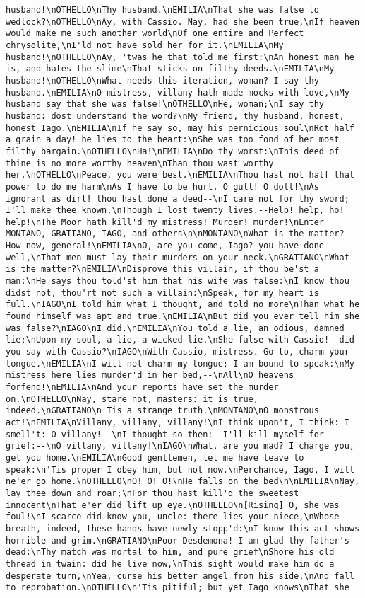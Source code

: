 \begin{verbatim}
husband!\nOTHELLO\nThy husband.\nEMILIA\nThat she was false to wedlock?\nOTHELLO\nAy, with Cassio. Nay, had she been true,\nIf heaven would make me such another world\nOf one entire and Perfect chrysolite,\nI'ld not have sold her for it.\nEMILIA\nMy husband!\nOTHELLO\nAy, 'twas he that told me first:\nAn honest man he is, and hates the slime\nThat sticks on filthy deeds.\nEMILIA\nMy husband!\nOTHELLO\nWhat needs this iteration, woman? I say thy husband.\nEMILIA\nO mistress, villany hath made mocks with love,\nMy husband say that she was false!\nOTHELLO\nHe, woman;\nI say thy husband: dost understand the word?\nMy friend, thy husband, honest, honest Iago.\nEMILIA\nIf he say so, may his pernicious soul\nRot half a grain a day! he lies to the heart:\nShe was too fond of her most filthy bargain.\nOTHELLO\nHa!\nEMILIA\nDo thy worst:\nThis deed of thine is no more worthy heaven\nThan thou wast worthy her.\nOTHELLO\nPeace, you were best.\nEMILIA\nThou hast not half that power to do me harm\nAs I have to be hurt. O gull! O dolt!\nAs ignorant as dirt! thou hast done a deed--\nI care not for thy sword; I'll make thee known,\nThough I lost twenty lives.--Help! help, ho! help!\nThe Moor hath kill'd my mistress! Murder! murder!\nEnter MONTANO, GRATIANO, IAGO, and others\n\nMONTANO\nWhat is the matter? How now, general!\nEMILIA\nO, are you come, Iago? you have done well,\nThat men must lay their murders on your neck.\nGRATIANO\nWhat is the matter?\nEMILIA\nDisprove this villain, if thou be'st a man:\nHe says thou told'st him that his wife was false:\nI know thou didst not, thou'rt not such a villain:\nSpeak, for my heart is full.\nIAGO\nI told him what I thought, and told no more\nThan what he found himself was apt and true.\nEMILIA\nBut did you ever tell him she was false?\nIAGO\nI did.\nEMILIA\nYou told a lie, an odious, damned lie;\nUpon my soul, a lie, a wicked lie.\nShe false with Cassio!--did you say with Cassio?\nIAGO\nWith Cassio, mistress. Go to, charm your tongue.\nEMILIA\nI will not charm my tongue; I am bound to speak:\nMy mistress here lies murder'd in her bed,--\nAll\nO heavens forfend!\nEMILIA\nAnd your reports have set the murder on.\nOTHELLO\nNay, stare not, masters: it is true, indeed.\nGRATIANO\n'Tis a strange truth.\nMONTANO\nO monstrous act!\nEMILIA\nVillany, villany, villany!\nI think upon't, I think: I smell't: O villany!--\nI thought so then:--I'll kill myself for grief:--\nO villany, villany!\nIAGO\nWhat, are you mad? I charge you, get you home.\nEMILIA\nGood gentlemen, let me have leave to speak:\n'Tis proper I obey him, but not now.\nPerchance, Iago, I will ne'er go home.\nOTHELLO\nO! O! O!\nHe falls on the bed\n\nEMILIA\nNay, lay thee down and roar;\nFor thou hast kill'd the sweetest innocent\nThat e'er did lift up eye.\nOTHELLO\n[Rising] O, she was foul!\nI scarce did know you, uncle: there lies your niece,\nWhose breath, indeed, these hands have newly stopp'd:\nI know this act shows horrible and grim.\nGRATIANO\nPoor Desdemona! I am glad thy father's dead:\nThy match was mortal to him, and pure grief\nShore his old thread in twain: did he live now,\nThis sight would make him do a desperate turn,\nYea, curse his better angel from his side,\nAnd fall to reprobation.\nOTHELLO\n'Tis pitiful; but yet Iago knows\nThat she 
\end{verbatim}
